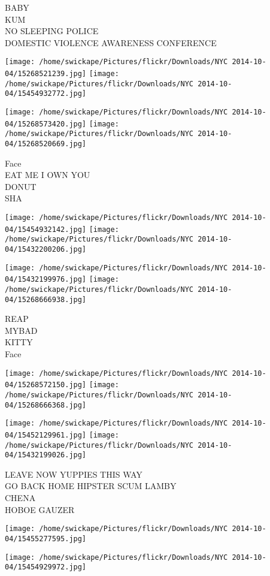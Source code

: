 \documentclass[10pt,letterpaper]{article}
\begin{document}
BABY\\
KUM\\
NO SLEEPING POLICE\\
DOMESTIC VIOLENCE AWARENESS CONFERENCE
\pagebreak

\texttt{[image: /home/swickape/Pictures/flickr/Downloads/NYC 2014-10-04/15268521239.jpg]}
\texttt{[image: /home/swickape/Pictures/flickr/Downloads/NYC 2014-10-04/15454932772.jpg]}

\texttt{[image: /home/swickape/Pictures/flickr/Downloads/NYC 2014-10-04/15268573420.jpg]}
\texttt{[image: /home/swickape/Pictures/flickr/Downloads/NYC 2014-10-04/15268520669.jpg]}

Face\\
EAT ME I OWN YOU\\
DONUT\\
SHA
\pagebreak

\texttt{[image: /home/swickape/Pictures/flickr/Downloads/NYC 2014-10-04/15454932142.jpg]}
\texttt{[image: /home/swickape/Pictures/flickr/Downloads/NYC 2014-10-04/15432200206.jpg]}

\texttt{[image: /home/swickape/Pictures/flickr/Downloads/NYC 2014-10-04/15432199976.jpg]}
\texttt{[image: /home/swickape/Pictures/flickr/Downloads/NYC 2014-10-04/15268666938.jpg]}

REAP\\
MYBAD\\
KITTY\\
Face
\pagebreak

\texttt{[image: /home/swickape/Pictures/flickr/Downloads/NYC 2014-10-04/15268572150.jpg]}
\texttt{[image: /home/swickape/Pictures/flickr/Downloads/NYC 2014-10-04/15268666368.jpg]}

\texttt{[image: /home/swickape/Pictures/flickr/Downloads/NYC 2014-10-04/15452129961.jpg]}
\texttt{[image: /home/swickape/Pictures/flickr/Downloads/NYC 2014-10-04/15432199026.jpg]}

LEAVE NOW YUPPIES THIS WAY\\
GO BACK HOME HIPSTER SCUM LAMBY\\
CHENA\\
HOBOE GAUZER
\pagebreak

\texttt{[image: /home/swickape/Pictures/flickr/Downloads/NYC 2014-10-04/15455277595.jpg]}

\vspace{0.25in}
\texttt{[image: /home/swickape/Pictures/flickr/Downloads/NYC 2014-10-04/15454929972.jpg]}
\end{document}
